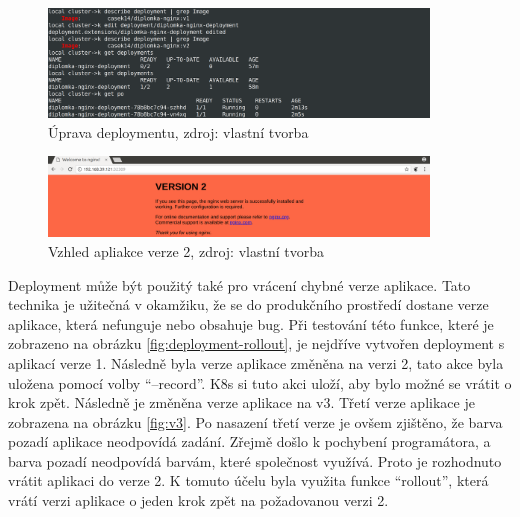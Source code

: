 \begin{figure}[H]
  \begin{centering}
    
	  \includegraphics[width=0.9\textwidth]{images/deployment-update.png}
    \par
	  \caption{Úprava deploymentu\label{fig:update-deployment}, zdroj: vlastní tvorba}
    \end{centering}
\end{figure}

\begin{figure}[H]
  \begin{centering}
    
	  \includegraphics[width=0.9\textwidth]{images/v2.png}
    \par
	  \caption{Vzhled apliakce verze 2\label{fig:v2}, zdroj: vlastní tvorba}
    \end{centering}
\end{figure}
Deployment může být použitý také pro vrácení chybné verze aplikace. Tato technika je užitečná v okamžiku, že se do produkčního prostředí dostane verze aplikace, která nefunguje nebo obsahuje bug. Při testování této funkce, které je zobrazeno na obrázku \ref{fig:deployment-rollout}, je nejdříve vytvořen deployment s aplikací verze 1. Následně byla verze aplikace změněna na verzi 2, tato akce byla uložena pomocí volby “--record”. K8s si tuto akci uloží, aby bylo možné se vrátit o krok zpět. Následně je změněna verze aplikace na v3. Třetí verze aplikace je zobrazena na obrázku \ref{fig:v3}. Po nasazení třetí verze je ovšem zjištěno, že barva pozadí aplikace neodpovídá zadání. Zřejmě došlo k pochybení programátora, a barva pozadí neodpovídá barvám, které společnost využívá. Proto je rozhodnuto vrátit aplikaci do verze 2. K tomuto účelu byla využita funkce “rollout”, která vrátí verzi aplikace o jeden krok zpět na požadovanou verzi 2.

